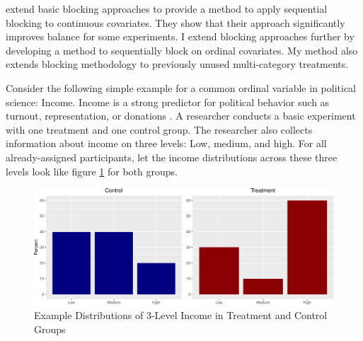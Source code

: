 \documentclass[12pt,]{article}
\makeatletter
\def\maxwidth{\ifdim\Gin@nat@width>\linewidth\linewidth
\else\Gin@nat@width\fi}
\let\Oldincludegraphics\includegraphics
\renewcommand{\includegraphics}[1]{\Oldincludegraphics[width=\maxwidth]{#1}}
\makeatother
\begin{document}
\citet{moore_blocking_2013} extend basic blocking approaches to provide
a method to apply sequential blocking to continuous covariates. They
show that their approach significantly improves balance for some
experiments. I extend blocking approaches further by developing a method
to sequentially block on ordinal covariates. My method also extends
blocking methodology to previously unused multi-category treatments.

Consider the following simple example for a common ordinal variable in
political science: Income. Income is a strong predictor for political
behavior such as turnout, representation, or donations
\citep{dawood_campaign_2015, fiorina_disconnect_2009, leighley_who_2014}.
A researcher conducts a basic experiment with one treatment and one
control group. The researcher also collects information about income on
three levels: Low, medium, and high. For all already-assigned
participants, let the income distributions across these three levels
look like figure \ref{OrdIntEx} for both groups.

\begin{figure}
\centering
\includegraphics{prospectus_files/figure-latex/Plot_Ordinal_Income_Example-1.pdf}
\caption{Example Distributions of 3-Level Income in Treatment and
Control Groups\label{OrdIntEx}}
\end{figure}
\end{document}
